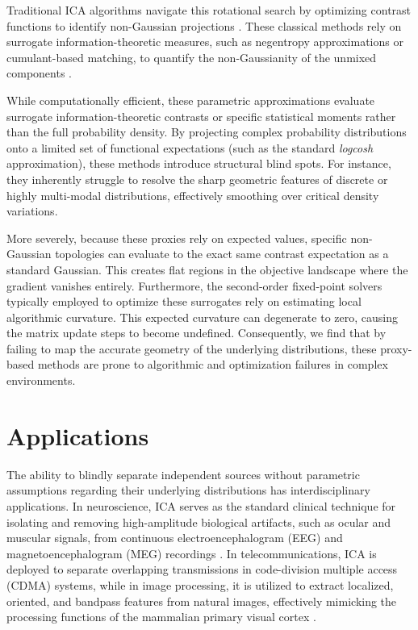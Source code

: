 \documentclass[12pt,a4paper,twoside,openany]{book}
\begin{document}
Traditional ICA algorithms navigate this rotational search by optimizing contrast functions to identify non-Gaussian projections \cite[Chapter 8]{hyvarinen2001}. 
These classical methods rely on surrogate information-theoretic measures, such as negentropy approximations or cumulant-based matching, 
to quantify the non-Gaussianity of the unmixed components \cite{amari1996new}. 

While computationally efficient, these parametric approximations evaluate surrogate information-theoretic contrasts or 
specific statistical moments rather than the full probability density. By projecting complex probability distributions 
onto a limited set of functional expectations (such as the standard \textit{logcosh} approximation), these methods introduce 
structural blind spots. For instance, they inherently struggle to resolve the sharp geometric features of discrete or highly 
multi-modal distributions, effectively smoothing over critical density variations.

More severely, because these proxies rely on expected values, specific non-Gaussian topologies can evaluate to the exact 
same contrast expectation as a standard Gaussian. This creates flat regions in the objective landscape where the gradient 
vanishes entirely. Furthermore, the second-order fixed-point solvers typically employed to optimize these surrogates rely 
on estimating local algorithmic curvature. This expected curvature can degenerate to zero, 
causing the matrix update steps to become undefined. Consequently, we find that by failing to map the accurate
geometry of the underlying distributions, these proxy-based methods are prone to algorithmic and
optimization failures in complex environments.

\section{Applications}

The ability to blindly separate independent sources without parametric assumptions regarding their underlying distributions has interdisciplinary applications. 
In neuroscience, ICA serves as the standard clinical technique for isolating and removing high-amplitude biological artifacts, such as ocular and muscular signals, 
from continuous electroencephalogram (EEG) and magnetoencephalogram (MEG) recordings \cite[Chapter 21]{hyvarinen2001}. 
In telecommunications, ICA is deployed to separate overlapping transmissions in code-division multiple access (CDMA) systems, 
while in image processing, it is utilized to extract localized, oriented, and bandpass features from natural images, 
effectively mimicking the processing functions of the mammalian primary visual cortex \cite[Chapters 22-23]{hyvarinen2001}.
\end{document}

